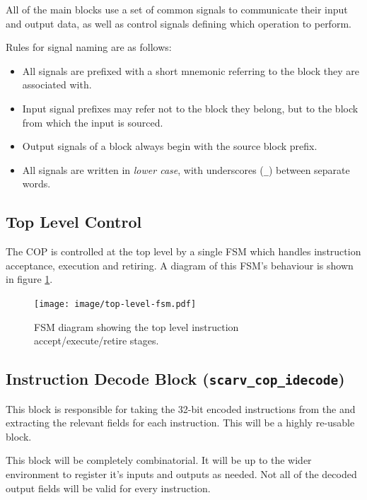 \documentclass{scarv-report}
\begin{document}
All of the main blocks use a set of common signals to communicate their
input and output data, as well as control signals defining which operation
to perform.

Rules for signal naming are as follows:
\begin{itemize}
\item All signals are prefixed with a short mnemonic referring to the
    block they are associated with.
\item Input signal prefixes may refer not to the block they belong, but
    to the block from which the input is sourced.
\item Output signals of a block always begin with the source block prefix.
\item All signals are written in {\em lower case}, with underscores ({\tt \_})
    between separate words.
\end{itemize}

\subsection{Top Level Control}

The COP is controlled at the top level by a single FSM which handles
instruction acceptance, execution and retiring. A diagram of this FSM's
behaviour is shown in figure \ref{fig:top-level-fsm}.

\begin{figure}[H]
\centering
\texttt{[image: image/top-level-fsm.pdf]}
\caption{FSM diagram showing the top level instruction accept/execute/retire
stages.}
\label{fig:top-level-fsm}
\end{figure}


\subsection{Instruction Decode Block ({\tt scarv\_cop\_idecode})}

This block is responsible for taking the 32-bit encoded instructions from
the \cpucopif and extracting the relevant fields for each instruction. This
will be a highly re-usable block.

This block will be completely combinatorial. It will be up to the wider
environment to register it's inputs and outputs as needed. Not all of the
decoded output fields will be valid for every instruction.
\end{document}
